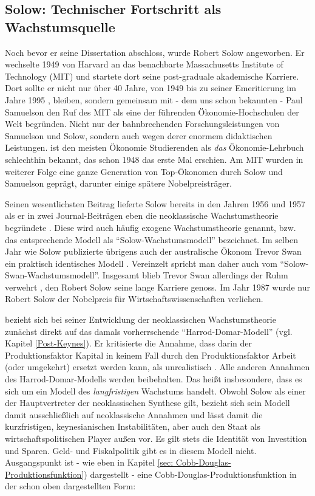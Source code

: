 \subsection{Solow: Technischer Fortschritt als Wachstumsquelle}
\label{sec: Solow-Modell}
Noch bevor er seine Dissertation abschloss, wurde Robert Solow angeworben. Er wechselte 1949 von Harvard an das benachbarte Massachusetts Institute of Technology (MIT) und startete dort seine post-graduale akademische Karriere. Dort sollte er nicht nur über 40 Jahre, von 1949 bis zu seiner Emeritierung im Jahre 1995 \parencite{Solow1987a}, bleiben, sondern gemeinsam mit - dem uns schon bekannten - Paul Samuelson den Ruf des MIT als eine der führenden Ökonomie-Hochschulen der Welt begründen. Nicht nur der bahnbrechenden Forschungsleistungen von Samuelson und Solow, sondern auch wegen derer enormem didaktischen Leistungen. \textcite{Samuelson1998} ist den meisten Ökonomie Studierenden als \textit{das} Ökonomie-Lehrbuch schlechthin bekannt, das schon 1948 das erste Mal erschien. Am MIT wurden in weiterer Folge eine ganze Generation von Top-Ökonomen durch Solow und Samuelson geprägt, darunter einige spätere Nobelpreisträger.

Seinen wesentlichsten Beitrag lieferte Solow bereits in den Jahren 1956 und 1957 als er in zwei Journal-Beiträgen eben die neoklassische Wachstumstheorie begründete \parencite{Solow1956, Solow1957}. Diese wird auch häufig exogene Wachstumstheorie genannt, bzw. das entsprechende Modell als "`Solow-Wachstumsmodell"' bezeichnet. Im selben Jahr wie Solow publizierte übrigens auch der australische Ökonom Trevor Swan ein praktisch identisches Modell \parencite{Swan1956}. Vereinzelt spricht man daher auch vom "`Solow-Swan-Wachstumsmodell"'. Insgesamt blieb Trevor Swan allerdings der Ruhm verwehrt \parencite{Dimand2009}, den Robert Solow seine lange Karriere genoss. Im Jahr 1987 wurde nur Robert Solow der Nobelpreis für Wirtschaftswissenschaften verliehen. 

\textcite{Solow1956} bezieht sich bei seiner Entwicklung der neoklassischen Wachstumstheorie zunächst direkt auf das damals vorherrschende "`Harrod-Domar-Modell"' (vgl. Kapitel \ref{Post-Keynes}). Er kritisierte die Annahme, dass darin der Produktionsfaktor Kapital in keinem Fall durch den Produktionsfaktor Arbeit (oder umgekehrt) ersetzt werden kann, als unrealistisch \parencite[S. 65]{Solow1956}. Alle anderen Annahmen des Harrod-Domar-Modells werden beibehalten. Das heißt insbesondere, dass es sich um ein Modell des \textit{langfristigen} Wachstums handelt. Obwohl Solow als einer der Hauptvertreter der neoklassischen Synthese gilt, bezieht sich sein Modell damit ausschließlich auf neoklassische Annahmen \parencite[S. 91]{Solow1956} und lässt damit die kurzfristigen, keynesianischen Instabilitäten, aber auch den Staat als wirtschaftspolitischen Player außen vor. Es gilt stets die Identität von Investition und Sparen. Geld- und Fiskalpolitik gibt es in diesem Modell nicht. Ausgangspunkt ist - wie eben in Kapitel \ref{sec: Cobb-Douglas-Produktionsfunktion}) dargestellt - eine Cobb-Douglas-Produktionsfunktion in der schon oben dargestellten Form:


